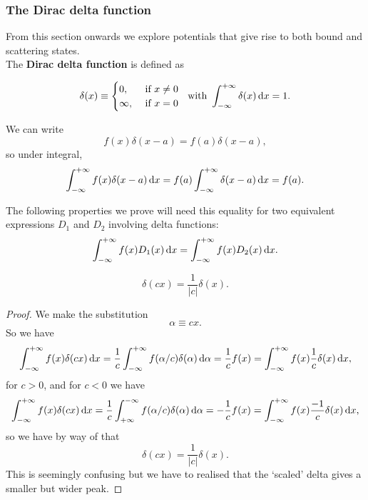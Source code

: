 \subsubsection{The Dirac delta function}
From this section onwards we explore potentials that give rise to both bound and 
scattering states. \\
The \textbf{Dirac delta function} is defined as
\begin{defi}
\begin{singlespace}
\begin{equation}
\delta(x)\equiv
\begin{cases}
	0,\ &\text{if }x\neq0\\
	\inf,\ &\text{if }x=0
\end{cases}
\ \ \text{with }\intinf\delta(x)\dx=1.
\end{equation}
\end{singlespace}
\end{defi}
\begin{prt}
We can write
\begin{equation}
f(x)\delta(x-a)=f(a)\delta(x-a), 
\end{equation}
so under integral, 
\begin{equation}
\intinf f(x)\delta(x-a)\dx=f(a)\intinf\delta(x-a)\dx=f(a).
\end{equation}
\end{prt}
The following properties we prove will need this equality for two equivalent expressions 
$D_1$ and $D_2$ involving delta functions: 
\begin{equation}
\label{delta_equiv}
\intinf f(x)D_1(x)\dx=\intinf f(x)D_2(x)\dx. 
\end{equation}
\begin{prt}
\begin{equation}
\delta(cx)=\frac{1}{|c|}\delta(x).
\end{equation}
\end{prt}
\begin{proof}
We make the substitution
\begin{equation}
\alpha\equiv cx.
\end{equation}
So we have
\begin{equation}
\intinf f(x)\delta(cx)\dx=\frac{1}{c}\intinf f(\alpha/c)\delta(\alpha)\dif\alpha=\frac{1}{c}f(x)=\intinf f(x)\frac{1}{c}\delta(x)\dx,
\end{equation}
for $c>0$, and for $c<0$ we have
\begin{equation}
\intinf f(x)\delta(cx)\dx=\frac{1}{c}\int^{-\inf}_{+\inf}f(\alpha/c)\delta(\alpha)\dif\alpha=-\frac{1}{c}f(x)=\intinf f(x)\frac{-1}{c}\delta(x)\dx,
\end{equation}
so we have by way of  that
\begin{equation}
\delta(cx)=\frac{1}{|c|}\delta(x).
\end{equation}
This is seemingly confusing but we have to realised that the `scaled' delta gives a smaller but wider peak. 
\end{proof}
